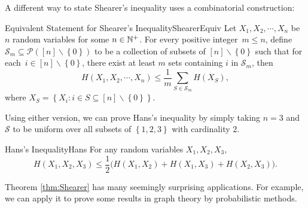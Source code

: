\documentclass[math]{amznotes}
\theoremstyle{remark}
\begin{document}
A different way to state Shearer's inequality uses a combinatorial construction:
\begin{thmbox}{Equivalent Statement for Shearer's Inequality}{ShearerEquiv}
    Let $X_1, X_2, \cdots, X_n$ be $n$ random variables for some $n \in \mathbb{N}^+$. For every positive integer~$m \leq n$, define $\mathcal{S}_m \subseteq \mathcal{P}\left(\left[n\right] \backslash \left\{0\right\}\right)$ to be a collection of subsets of $\left[n\right] \backslash \left\{0\right\}$ such that for each~$i \in \left[n\right] \backslash \left\{0\right\}$, there exist at least $m$ sets containing $i$ in $\mathcal{S}_m$, then
    \begin{equation*}
        H\left(X_1, X_2, \cdots, X_n\right) \leq \frac{1}{m}\sum_{S \in \mathcal{S}_m}H\left(X_{S}\right),
    \end{equation*}
    where $X_{S} = \left\{X_i \colon i \in S \subseteq \left[n\right] \backslash \left\{0\right\}\right\}$.
\end{thmbox}
Using either version, we can prove Hans's inequality by simply taking $n = 3$ and $\mathcal{S}$ to be uniform over all subsets of $\left\{1, 2, 3\right\}$ with cardinality $2$.
\begin{corbox}{Hans's Inequality}{Hans}
    For any random variables $X_1, X_2, X_3$,
    \begin{equation*}
        H\left(X_1, X_2, X_3\right) \leq \frac{1}{2}\bigl(H\left(X_1, X_2\right) + H\left(X_1, X_3\right) + H\left(X_2, X_3\right)\bigr).
    \end{equation*}
\end{corbox}
Theorem \ref{thm:Shearer} has many seemingly surprising applications. For example, we can apply it to prove some results in graph theory by probabilistic methods.
\end{document}
